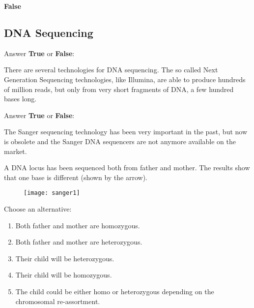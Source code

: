 \begin{Answer} [
   ref={ex13},
   number={13}
 ]

  \Question \textbf{False}

\end{Answer}

\subsection{DNA Sequencing}

\begin{Exercise} [
  title={NGS},
  difficulty={1},
  label={ex14},
  origin={G. Valle}
 ]

Answer \textbf{True} or \textbf{False}:

  \Question There are several technologies for DNA sequencing.
The so called Next Generation Sequencing technologies, like Illumina, are able
to produce hundreds of million reads, but only from very short fragments of
DNA, a few hundred bases long. 

\end{Exercise}

\begin{Exercise} [
  title={Sanger Sequencing},
  difficulty={1},
  label={ex15},
  origin={G. Valle}
 ]

Answer \textbf{True} or \textbf{False}:

  \Question The Sanger sequencing technology has been very important in the
past, but now is obsolete and the Sanger DNA sequencers are not anymore
available on the market.

\end{Exercise}

\begin{Exercise} [
  title={DNA Analysis},
  difficulty={1},
  label={ex16},
  origin={G. Valle}
 ]

A DNA locus has been sequenced both from father and mother.
The results show that one base is different (shown by the arrow).

 \begin{figure}[H]
  \centering
  \texttt{[image: sanger1]}
 \end{figure}

Choose an alternative:

\begin{enumerate}
  \item Both father and mother are homozygous.
  \item Both father and mother are heterozygous.
  \item Their child will be heterozygous.
  \item Their child will be homozygous.
  \item The child could be either homo or heterozygous depending on the
chromosomal re-assortment.
\end{enumerate}

\end{Exercise}

